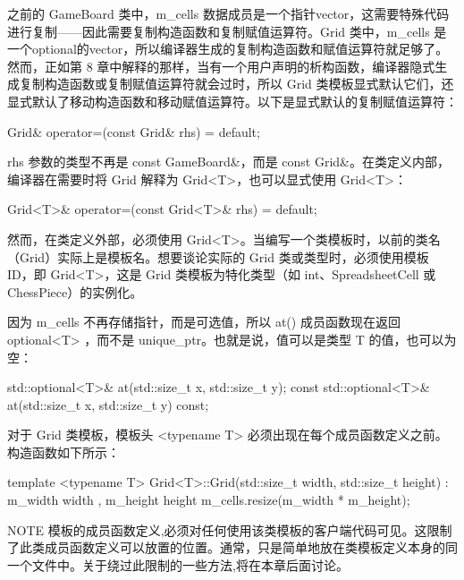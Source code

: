 之前的 GameBoard 类中，m\_cells 数据成员是一个指针vector，这需要特殊代码进行复制——因此需要复制构造函数和复制赋值运算符。Grid 类中，m\_cells 是一个optional的vector，所以编译器生成的复制构造函数和赋值运算符就足够了。然而，正如第 8 章中解释的那样，当有一个用户声明的析构函数，编译器隐式生成复制构造函数或复制赋值运算符就会过时，所以 Grid 类模板显式默认它们，还显式默认了移动构造函数和移动赋值运算符。以下是显式默认的复制赋值运算符：

\begin{cpp}
Grid& operator=(const Grid& rhs) = default;
\end{cpp}

rhs 参数的类型不再是 const GameBoard\&，而是 const Grid\&。在类定义内部，编译器在需要时将 Grid 解释为 Grid<T>，也可以显式使用 Grid<T>：

\begin{cpp}
Grid<T>& operator=(const Grid<T>& rhs) = default;
\end{cpp}

然而，在类定义外部，必须使用 Grid<T>。当编写一个类模板时，以前的类名（Grid）实际上是模板名。想要谈论实际的 Grid 类或类型时，必须使用模板 ID，即 Grid<T>，这是 Grid 类模板为特化类型（如 int、SpreadsheetCell 或 ChessPiece）的实例化。

因为 m\_cells 不再存储指针，而是可选值，所以 at() 成员函数现在返回 optional<T> ，而不是 unique\_ptr。也就是说，值可以是类型 T 的值，也可以为空：

\begin{cpp}
std::optional<T>& at(std::size_t x, std::size_t y);
const std::optional<T>& at(std::size_t x, std::size_t y) const;
\end{cpp}


对于 Grid 类模板，模板头 <typename T> 必须出现在每个成员函数定义之前。构造函数如下所示：

\begin{cpp}
template <typename T>
Grid<T>::Grid(std::size_t width, std::size_t height)
    : m_width { width }, m_height { height }
{
    m_cells.resize(m_width * m_height);
}
\end{cpp}

\begin{myNotic}{NOTE}
模板的成员函数定义,必须对任何使用该类模板的客户端代码可见。这限制了此类成员函数定义可以放置的位置。通常，只是简单地放在类模板定义本身的同一个文件中。关于绕过此限制的一些方法,将在本章后面讨论。
\end{myNotic}

